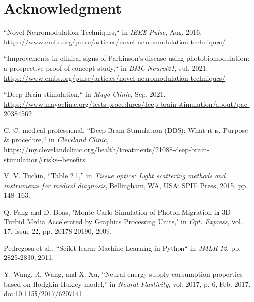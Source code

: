 \documentclass[journal,twoside,web]{ieeecolor}
\begin{document}
\section*{Acknowledgment}

\begin{thebibliography}{00}

 ``Novel Neuromodulation Techniques,`` in \emph{IEEE Pulse}, Aug. 2016. 
\url{https://www.embs.org/pulse/articles/novel-neuromodulation-techniques/} 

 ``Improvements in clinical signs of Parkinson's disease using photobiomodulation: a prospective proof-of-concept study,`` in \emph{BMC Neurol21}, Jul. 2021. 
\url{https://www.embs.org/pulse/articles/novel-neuromodulation-techniques/} 

 ``Deep Brain stimulation,`` in \emph{Mayo Clinic}, Sep. 2021. 
\url{https://www.mayoclinic.org/tests-procedures/deep-brain-stimulation/about/pac-20384562}

 C. C. medical professional, ``Deep Brain Stimulation (DBS): What it is, Purpose \& procedure,`` in \emph{Cleveland Clinic}, 
\url{https://my.clevelandclinic.org/health/treatments/21088-deep-brain-stimulation\#risks--benefits}

 V. V. Tuchin, “Table 2.1,” in \emph{Tissue optics: Light scattering methods and instruments for medical diagnosis}, 
Bellingham, WA, USA: SPIE Press, 2015, pp. 148–163. 

 Q. Fang and D. Boas, "Monte Carlo Simulation of Photon Migration in 3D Turbid Media Accelerated by Graphics Processing Units," in \emph{Opt. Express}, 
vol. 17, issue 22, pp. 20178-20190, 2009.

 Pedregosa et al., ``Scikit-learn: Machine Learning in Python`` in \emph{JMLR 12}, pp. 2825-2830, 2011.

 Y. Wang, R. Wang, and X. Xu, “Neural energy supply-consumption properties based on Hodgkin-Huxley model,” in \emph{Neural Plasticity}, 
vol. 2017, p. 6, Feb. 2017. doi:\url{10.1155/2017/6207141} 

\end{thebibliography}

\appendices
\end{document}
